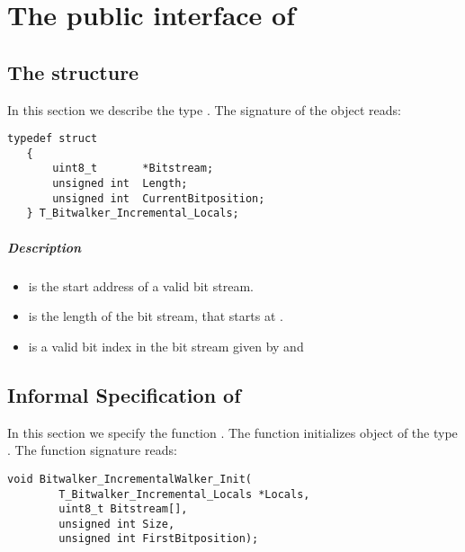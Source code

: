

\chapter{The public interface of \bitwalker}

\section{The structure \bitwalkertype}


In this section we describe the type \locals.
The signature of the object reads:

\begin{lstlisting}[style=acsl-block]
   typedef struct
   {
       uint8_t       *Bitstream;
       unsigned int  Length;
       unsigned int  CurrentBitposition;
   } T_Bitwalker_Incremental_Locals;
\end{lstlisting}


\paragraph{Description}

\begin{itemize}

   \item {} is  the start address of a valid bit stream.
   \item {} is the length of the bit stream, that starts at .
   \item {} is a valid bit index in
              the bit stream given by  and 

\end{itemize}


\clearpage

\section{Informal Specification of }

In this section we specify the function \init.
 The function  initializes object of the type \locals.
The function signature reads:


\begin{lstlisting}[style=acsl-block]
void Bitwalker_IncrementalWalker_Init(
        T_Bitwalker_Incremental_Locals *Locals,
        uint8_t Bitstream[],
        unsigned int Size,
        unsigned int FirstBitposition);
\end{lstlisting}


